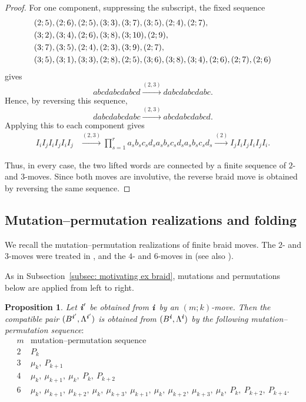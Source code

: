 \documentclass[12pt, leqno]{amsart}
\numberwithin{equation}{section}
\theoremstyle{plain}
\newtheorem{proposition}[lemma]{Proposition}
\theoremstyle{definition}
\newcommand{\ii}{ \textbf{\textit{i}}}
\begin{document}
\begin{proof}
For one component, suppressing the subscript, the fixed sequence
\begin{align*}
&(2;5),(2;6),(2;5),(3;3),(3;7),(3;5),(2;4),(2;7),\allowdisplaybreaks\\
&(3;2),(3;4),(2;6),(3;8),(3;10),(2;9),\allowdisplaybreaks\\
&(3;7),(3;5),(2;4),(2;3),(3;9),(2;7),\allowdisplaybreaks\\
&(3;5),(3;1),(3;3),(2;8),(2;5),
(3;6),(3;8),(3;4),(2;6),(2;7),(2;6)
\end{align*}
gives
\[
abcdabcdabcd \overset{(2,3)}{\longrightarrow} dabcdabcdabc.
\]
Hence, by reversing this sequence,
\[
dabcdabcdabc \overset{(2,3)}{\longrightarrow} abcdabcdabcd.
\]
Applying this to each component gives
\begin{align*}
I_iI_jI_iI_jI_iI_j &\overset{(2,3)}{\longrightarrow}
\prod_{s=1}^r
a_sb_sc_sd_sa_sb_sc_sd_sa_sb_sc_sd_s \overset{(2)}{\longrightarrow}
I_jI_iI_jI_iI_jI_i.
\end{align*}

Thus, in every case,  the two lifted words  are connected
by a finite sequence of $2$- and $3$-moves. Since both moves are
involutive, the reverse braid move is obtained by reversing the same
sequence.
\end{proof}

\subsection{Mutation--permutation realizations and 
folding
} 
\label{subsec: mu+per}

We recall the mutation--permutation realizations of finite braid moves.
The $2$- and $3$-moves were treated in \cite{FHOO2}, and the $4$- and
$6$-moves in \cite{LO24}  (see also \cite{SW21}).

As in Subsection~\ref{subsec: motivating ex braid}, mutations and permutations below are applied
from left to right.

\begin{proposition} \cite{FHOO2,LO24}\label{prop: mutation permutation braid moves}
Let $\ii'$ be obtained from $\ii$ by an $(m;k)$-move.
Then the compatible pair $(B^{\ii'},\Lambda^{\ii'})$ is obtained from
$(B^\ii,\Lambda^\ii)$ by the following mutation--permutation sequence$:$
\[
\begin{array}{c|c}
m & \text{mutation--permutation sequence} \\ \hline
2 & P_k \\[1mm]
3 & \mu_k,\ P_{k+1} \\[1mm]
4 & \mu_k,\ \mu_{k+1},\ \mu_k,\ P_k,\ P_{k+2} \\[1mm]
6 & \mu_k,\ \mu_{k+1},\ \mu_{k+2},\ \mu_k,\ \mu_{k+3},\
\mu_{k+1},\ \mu_k,\ \mu_{k+2},\ \mu_{k+3},\ \mu_k,\
P_k,\ P_{k+2},\ P_{k+4}.
\end{array}
\]
\end{proposition}
\end{document}
